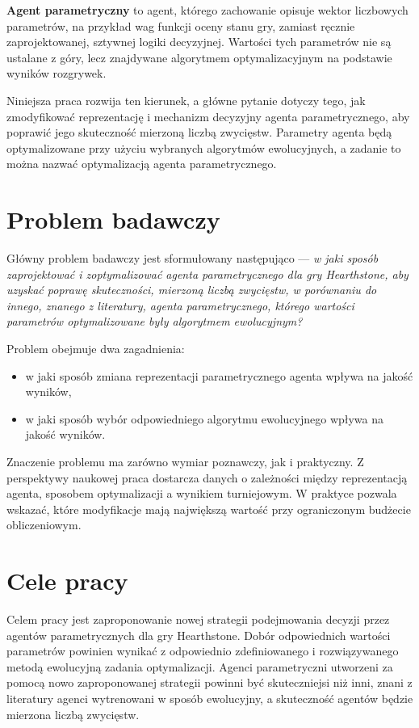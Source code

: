 \textbf{Agent parametryczny} to agent, którego zachowanie opisuje wektor liczbowych parametrów, na przykład wag funkcji oceny stanu gry, zamiast ręcznie zaprojektowanej, sztywnej logiki decyzyjnej. Wartości tych parametrów nie są ustalane z góry, lecz znajdywane algorytmem optymalizacyjnym na podstawie wyników rozgrywek.

Niniejsza praca rozwija ten kierunek, a główne pytanie dotyczy tego, jak zmodyfikować reprezentację i mechanizm decyzyjny agenta parametrycznego, aby poprawić jego skuteczność mierzoną liczbą zwycięstw. Parametry agenta będą optymalizowane przy użyciu wybranych algorytmów ewolucyjnych, a zadanie to można nazwać optymalizacją agenta parametrycznego.

\section{Problem badawczy}

Główny problem badawczy jest sformułowany następująco --- \textit{w jaki sposób zaprojektować i zoptymalizować agenta parametrycznego dla gry Hearthstone, aby uzyskać poprawę skuteczności, mierzoną liczbą zwycięstw, w porównaniu do innego, znanego z literatury, agenta parametrycznego, którego wartości parametrów optymalizowane były algorytmem ewolucyjnym?}

Problem obejmuje dwa zagadnienia:
\begin{itemize}
    \item w jaki sposób zmiana reprezentacji parametrycznego agenta wpływa na jakość wyników,
    \item w jaki sposób wybór odpowiedniego algorytmu ewolucyjnego wpływa na jakość wyników.
\end{itemize}

Znaczenie problemu ma zarówno wymiar poznawczy, jak i praktyczny. Z perspektywy naukowej praca dostarcza danych o zależności między reprezentacją agenta, sposobem optymalizacji a wynikiem turniejowym. W praktyce pozwala wskazać, które modyfikacje mają największą wartość przy ograniczonym budżecie obliczeniowym.

\section{Cele pracy}

Celem pracy jest zaproponowanie nowej strategii podejmowania decyzji przez agentów parametrycznych dla gry Hearthstone. Dobór odpowiednich wartości parametrów powinien wynikać z odpowiednio zdefiniowanego i rozwiązywanego metodą ewolucyjną zadania optymalizacji. Agenci parametryczni utworzeni za pomocą nowo zaproponowanej strategii powinni być skuteczniejsi niż inni, znani z literatury agenci wytrenowani w sposób ewolucyjny, a skuteczność agentów będzie mierzona liczbą zwycięstw.

